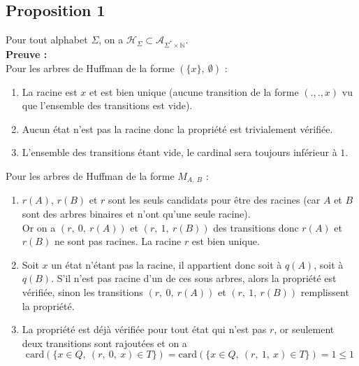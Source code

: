 \documentclass[a4paper, 12pt]{article}
\let\qed\square
\begin{document}
\subsection{Proposition 1}
Pour tout alphabet $\Sigma$, on a $\mathcal{H}_\Sigma \subset \mathcal{A}_{\Sigma^*\times \mathbb{N}}$. \\
\textbf{Preuve :} \\
Pour les arbres de Huffman de la forme $(\{x\},\ \emptyset)$ :
\begin{enumerate}
\item La racine est $x$ et est bien unique (aucune transition de la forme $(., ., x)$ vu que l'ensemble des transitions est vide).
\item Aucun état n'est pas la racine donc la propriété est trivialement vérifiée.
\item L'ensemble des transitions étant vide, le cardinal sera toujours inférieur à $1$.
\end{enumerate}
Pour les arbres de Huffman de la forme $M_{A,\ B}$ :
\begin{enumerate}
\item $r(A)$, $r(B)$ et $r$ sont les seuls candidats pour être des racines (car $A$ et $B$ sont des arbres binaires et n'ont qu'une seule racine). \\
Or on a $(r,\ 0,\ r(A))$ et $(r,\ 1,\ r(B))$ des transitions donc $r(A)$ et $r(B)$ ne sont pas racines. La racine $r$ est bien unique.
\item Soit $x$ un état n'étant pas la racine, il appartient donc soit à $q(A)$, soit à $q(B)$. S'il n'est pas racine d'un de ces sous arbres, alors la propriété est vérifiée, sinon les transitions $(r,\ 0,\ r(A))$ et $(r,\ 1,\ r(B))$ remplissent la propriété.
\item La propriété est déjà vérifiée pour tout état qui n'est pas $r$, or seulement deux transitions sont rajoutées et on a
$$
\text{card}(\{x \in Q,\ (r,\ 0,\ x) \in T\}) = \text{card}(\{x \in Q,\ (r,\ 1,\ x) \in T\}) = 1 \leq 1
$$
\end{enumerate}
\qed
\end{document}
